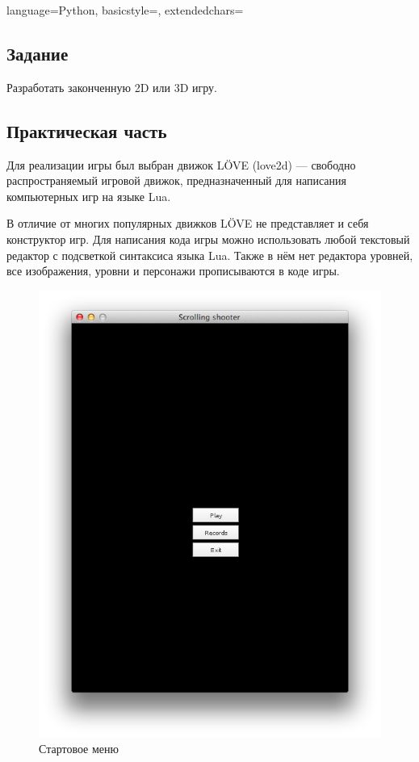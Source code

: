 \documentclass[12pt]{article}
\begin{document}

\lstset
{
        language=Python,
        basicstyle=\footnotesize,%
        extendedchars=\true
}

\subsection*{Задание}

Разработать законченную 2D или 3D игру.

\subsection*{Практическая часть}
Для реализации игры был выбран движок LÖVE (love2d) --- свободно распространяемый игровой движок,
предназначенный для написания компьютерных игр на языке Lua.

В отличие от многих популярных движков LÖVE не представляет и себя конструктор игр.
Для написания кода игры можно использовать любой текстовый редактор с подсветкой синтаксиса языка Lua.
Также в нём нет редактора уровней, все изображения, уровни и персонажи прописываются в коде игры.~\cite{love}

\begin{figure}[!htb]
  \centering
    \includegraphics[scale=0.5]{pics/start.png}
   \caption{Стартовое меню}
    \label{fig:start}
\end{figure}
\end{document}
